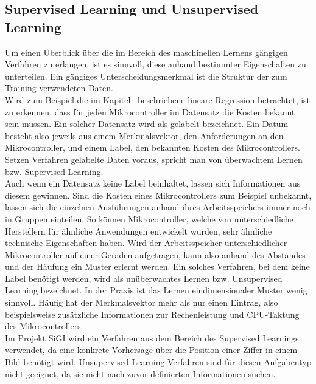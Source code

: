 \subsection{Supervised Learning und Unsupervised Learning}\label{subsec:Supervised Learning und Unsupervised Learning}
    Um einen Überblick über die im Bereich des maschinellen Lernens gängigen Verfahren zu erlangen, ist es sinnvoll, diese anhand bestimmter Eigenschaften zu unterteilen. Ein gängiges Unterscheidungsmerkmal ist die Struktur der zum Training verwendeten Daten.\\
    Wird zum Beispiel die im Kapitel~ beschriebene lineare Regression betrachtet, ist zu erkennen, dass für jeden Mikrocontroller im Datensatz die Kosten bekannt sein müssen. Ein solcher Datensatz wird als gelabelt bezeichnet. Ein Datum besteht also jeweils aus einem Merkmalsvektor, den Anforderungen an den Mikrocontroller, und einem Label, den bekannten Kosten des Mikrocontrollers. Setzen Verfahren gelabelte Daten voraus, spricht man von überwachtem Lernen bzw. Supervised Learning\cite{Richter2019_1}.\\ Auch wenn ein Datensatz keine Label beinhaltet, lassen sich Informationen aus diesem gewinnen. Sind die Kosten eines Mikrocontrollers zum Beispiel unbekannt, lassen sich die einzelnen Ausführungen anhand ihres Arbeitsspeichers immer noch in Gruppen einteilen. So können Mikrocontroller, welche von unterschiedliche Herstellern für ähnliche Anwendungen entwickelt wurden, sehr ähnliche technische Eigenschaften haben. Wird der Arbeitsspeicher unterschiedlicher Mikrocontroller auf einer Geraden aufgetragen, kann also anhand des Abstandes und der Häufung ein Muster erlernt werden. Ein solches Verfahren, bei dem keine Label benötigt werden, wird als unüberwachtes Lernen bzw. Unsupervised Learning bezeichnet. In der Praxis ist das Lernen eindimensionaler Muster wenig sinnvoll. Häufig hat der Merkmalsvektor mehr als nur einen Eintrag, also beispielsweise zusätzliche Informationen zur Rechenleistung und CPU-Taktung des Mikrocontrollers\cite{Richter2019_9}.\\ Im Projekt SiGI wird ein Verfahren aus dem Bereich des Supervised Learnings verwendet, da eine konkrete Vorhersage über die Position einer Ziffer in einem Bild benötigt wird. Unsupervised Learning Verfahren sind für diesen Aufgabentyp nicht geeignet, da sie nicht nach zuvor definierten Informationen suchen\cite{James2013-12}.  
    
